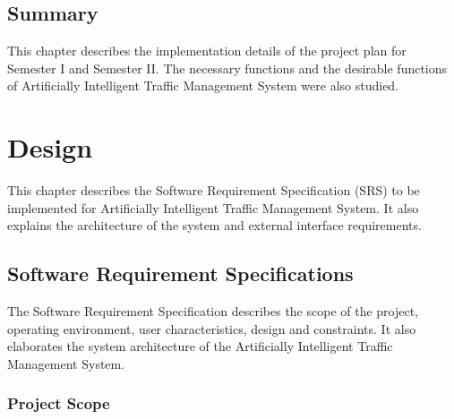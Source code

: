 \documentclass[openany,12pt]{report}
\begin{document}
	\section{Summary}
	\hspace*{0.5in}This chapter describes the implementation details of the project plan for Semester I and Semester II. The necessary functions and the desirable functions of Artificially Intelligent Traffic Management System were also studied.
	\chapter{Design}
	\hspace*{0.5in}This chapter describes the Software Requirement Specification (SRS) to be implemented for Artificially Intelligent Traffic Management System. It also explains the architecture of the system and external interface requirements.\\
	
	\section{Software Requirement Specifications}
	\hspace*{0.5in} The Software Requirement Specification describes the scope of the project, operating environment, user characteristics, design and constraints. It also elaborates the system architecture of the Artificially Intelligent Traffic Management System.
	
	\subsection{Project Scope}
	
\end{document}
